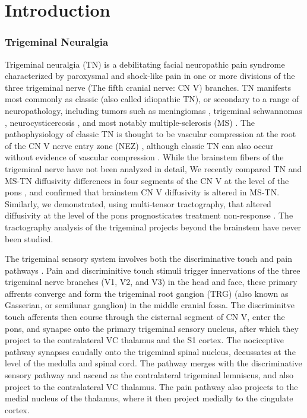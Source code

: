 
\section{Introduction}
\subsubsection{Trigeminal Neuralgia}
Trigeminal neuralgia (TN) is a debilitating facial neuropathic pain syndrome characterized by paroxysmal and shock-like pain in one or more divisions of the three trigeminal nerve (The fifth cranial nerve: CN V) branches. TN manifests most commonly as classic (also called idiopathic TN), or secondary to a range of neuropathology, including tumors such as meningiomas \cite{Cheng2008}, trigeminal schwannomas \cite{Miller2008}, neurocysticercosis \cite{Revuelta1995}, and most notably multiple-sclerosis (MS) \cite{Cruccu2009,VanderMeijs2002,Nick2012}. The pathophysiology of classic TN is thought to be vascular compression at the root of the CN V nerve entry zone (NEZ) \cite{Linn2011,Love2001}, although classic TN can also occur without evidence of vascular compression \cite{Lee2014}. While the brainstem fibers of the trigeminal nerve have not been analyzed in detail, We recently compared TN and MS-TN diffusivity differences in four segments of the CN V at the level of the pons \cite{Chen2016a}, and confirmed that brainstem CN V diffusivity is altered in MS-TN. Similarly, we demonstrated, using multi-tensor tractography, that altered diffusivity at the level of the pons prognosticates treatment non-response \cite{Hung2017}. The tractography analysis of the trigeminal projects beyond the brainstem have never been studied. 

The trigeminal sensory system involves both the discriminative touch and pain pathways \cite{Henssen2016}.  Pain and discriminitive touch stimuli trigger innervations of the three trigeminal nerve branches (V1, V2, and V3) in the head and face, these primary affrents converge and form the trigeminal root gangion (TRG) (also known as Gasserian, or semilunar ganglion) in the middle cranial fossa. The discriminitve touch afferents then course through the cisternal segment of CN V, enter the pons, and synapse onto the primary trigeminal sensory nucleus, after which they project to the contralateral VC thalamus and the S1 cortex. The nociceptive pathway synapses caudally onto the trigeminal spinal nucleus, decussates at the level of the medulla and spinal cord. The pathway merges with the discriminative sensory pathway and ascend as the contralateral trigeminal lemniscus, and also project to the contralateral VC thalamus. The pain pathway also projects to the medial nucleus of the thalamus, where it then project medially to the cingulate cortex. 

